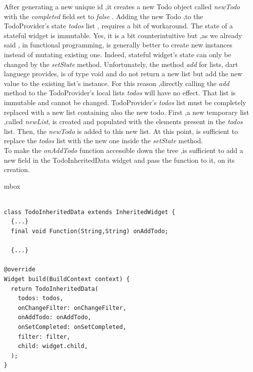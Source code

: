 After generating a new unique id ,it creates a new Todo object called \textit{newTodo }with the \textit{completed }field set to \textit{false }. Adding the new Todo ,to the TodoProvider’s state \textit{todos }list , requires a bit of workaround. The state of a stateful widget is immutable. Yes, it is a bit counterintuitive but ,as we already said , in functional programming, is generally better to create new instances instead of mutating existing one. Indeed, stateful widget's state can only be changed by the \textit{setState } method. Unfortunately, the method \textit{add} for lists, dart languege provides, is of type void and do not return a new list but add the new value to the existing list's instance. For this reason ,directly calling the \textit{add} method to the TodoProvider’s local lists \textit{todos }will have no effect. That list is immutable and cannot be changed.
TodoProvider’s \textit{todos }list must be completely replaced with a new list containing also the new todo. First ,a new temporary list ,called \textit{newList}, is created and populated with the elements present in the \textit{todos }list. Then, the \textit{newTodo }is added to this new list. At this point, is sufficient to replace the \textit{todos }list with the new one inside the \textit{setState} method.\\
To make the \textit{onAddTodo} function accessible down the tree ,is sufficient to add a new field in the TodoInheritedData widget and pass the function to it, on its creation.
\mbox{}\\

\begin{code}

mbox{}\\

\label{code:2.32}
\begin{verbatim}

class TodoInheritedData extends InheritedWidget {
  {...}
  final void Function(String,String) onAddTodo;

  {...}

@override
Widget build(BuildContext context) {
  return TodoInheritedData(
    todos: todos,
    onChangeFilter: onChangeFilter,
    onAddTodo: onAddTodo,
    onSetCompleted: onSetCompleted,
    filter: filter,
    child: widget.child,
  );
}
\end{verbatim}
\end{code}
\mbox{}\\

